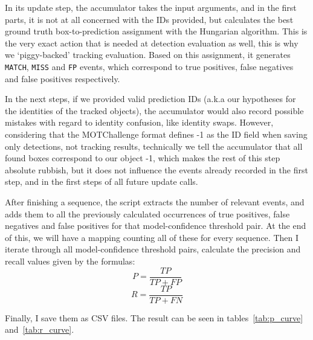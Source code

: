 In its update step, the accumulator takes the input arguments, and in the first parts, it is not at all concerned with the IDs provided, but calculates the best ground truth box-to-prediction assignment with the Hungarian algorithm. This is the very exact action that is needed at detection evaluation as well, this is why we `piggy-backed' tracking evaluation. Based on this assignment, it generates \verb|MATCH|, \verb|MISS| and \verb|FP| events, which correspond to true positives, false negatives and false positives respectively.

In the next steps, if we provided valid prediction IDs (a.k.a our hypotheses for the identities of the tracked objects), the accumulator would also record possible mistakes with regard to identity confusion, like identity swaps. However, considering that the MOTChallenge format defines -1 as the ID field when saving only detections, not tracking results, technically we tell the accumulator that all found boxes correspond to our object -1, which makes the rest of this step absolute rubbish, but it does not influence the events already recorded in the first step, and in the first steps of all future update calls.

After finishing a sequence, the script extracts the number of relevant events, and adds them to all the previously calculated occurrences of true positives, false negatives and false positives for that model-confidence threshold pair. At the end of this, we will have a mapping counting all of these for every sequence. Then I iterate through all model-confidence threshold pairs, calculate the precision and recall values given by the formulas:
\[P = \frac{TP}{TP + FP}\]
\[R = \frac{TP}{TP + FN}\]

Finally, I save them as CSV files. The result can be seen in tables~\ref{tab:p_curve} and~\ref{tab:r_curve}.

